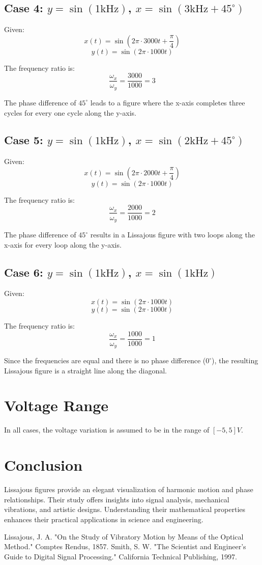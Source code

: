 \documentclass{article}
\begin{document}
\subsection{Case 4: $y = \sin(1\text{kHz})$, $x = \sin(3\text{kHz} + 45^\circ)$}

Given:
\[
x(t) = \sin(2\pi \cdot 3000 t + \frac{\pi}{4})
\]
\[
y(t) = \sin(2\pi \cdot 1000 t)
\]

The frequency ratio is:
\[
\frac{\omega_x}{\omega_y} = \frac{3000}{1000} = 3
\]

The phase difference of \( 45^\circ \) leads to a figure where the x-axis completes three cycles for every one cycle along the y-axis.

\subsection{Case 5: $y = \sin(1\text{kHz})$, $x = \sin(2\text{kHz} + 45^\circ)$}

Given:
\[
x(t) = \sin(2\pi \cdot 2000 t + \frac{\pi}{4})
\]
\[
y(t) = \sin(2\pi \cdot 1000 t)
\]

The frequency ratio is:
\[
\frac{\omega_x}{\omega_y} = \frac{2000}{1000} = 2
\]

The phase difference of \( 45^\circ \) results in a Lissajous figure with two loops along the x-axis for every loop along the y-axis.

\subsection{Case 6: $y = \sin(1\text{kHz})$, $x = \sin(1\text{kHz})$}

Given:
\[
x(t) = \sin(2\pi \cdot 1000 t)
\]
\[
y(t) = \sin(2\pi \cdot 1000 t)
\]

The frequency ratio is:
\[
\frac{\omega_x}{\omega_y} = \frac{1000}{1000} = 1
\]

Since the frequencies are equal and there is no phase difference (\( 0^\circ \)), the resulting Lissajous figure is a straight line along the diagonal.

\section{Voltage Range}
In all cases, the voltage variation is assumed to be in the range of $[-5, 5]V$.

\section{Conclusion}
Lissajous figures provide an elegant visualization of harmonic motion and phase relationships. Their study offers insights into signal analysis, mechanical vibrations, and artistic designs. Understanding their mathematical properties enhances their practical applications in science and engineering.

\begin{thebibliography}{9}
 Lissajous, J. A. "On the Study of Vibratory Motion by Means of the Optical Method." Comptes Rendus, 1857.
 Smith, S. W. "The Scientist and Engineer's Guide to Digital Signal Processing." California Technical Publishing, 1997.
\end{thebibliography}
\end{document}
